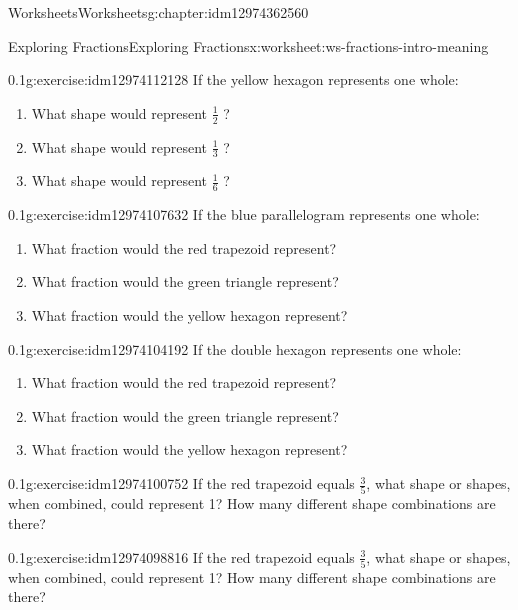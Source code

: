 \documentclass[twoside,11pt,]{book}
\begin{document}
\begin{chapterptx}{Worksheets}{}{Worksheets}{}{}{g:chapter:idm12974362560}
\begin{worksheet-section-numberless}{Exploring Fractions}{}{Exploring Fractions}{}{}{x:worksheet:ws-fractions-intro-meaning}
\begin{divisionexercise}{4}{}{0.1}{g:exercise:idm12974112128}%
If the yellow hexagon represents one whole:%
%
\begin{enumerate}[label=(\alph*)]
\item{}What shape would represent \(\frac{1}{2} \) ?%
\item{}What shape would represent \(\frac{1}{3} \) ?%
\item{}What shape would represent \(\frac{1}{6} \) ?%
\end{enumerate}
\end{divisionexercise}%
\begin{divisionexercise}{5}{}{0.1}{g:exercise:idm12974107632}%
If the blue parallelogram represents one whole:%
%
\begin{enumerate}[label=(\alph*)]
\item{}What fraction would the red trapezoid represent?%
\item{}What fraction would the green triangle represent?%
\item{}What fraction would the yellow hexagon represent?%
\end{enumerate}
\end{divisionexercise}%
\begin{divisionexercise}{6}{}{0.1}{g:exercise:idm12974104192}%
If the double hexagon represents one whole:%
%
\begin{enumerate}[label=(\alph*)]
\item{}What fraction would the red trapezoid represent?%
\item{}What fraction would the green triangle represent?%
\item{}What fraction would the yellow hexagon represent?%
\end{enumerate}
\end{divisionexercise}%
\begin{divisionexercise}{7}{}{0.1}{g:exercise:idm12974100752}%
If the red trapezoid equals \(\frac{3}{5} \), what shape or shapes, when combined, could represent 1?  How many different shape combinations are there?%
\end{divisionexercise}%
\begin{divisionexercise}{8}{}{0.1}{g:exercise:idm12974098816}%
If the red trapezoid equals \(\frac{3}{5} \), what shape or shapes, when combined, could represent 1?  How many different shape combinations are there?%
\end{divisionexercise}%
\begin{introduction}{}%

\end{introduction}
\end{worksheet-section-numberless}
\end{chapterptx}
\end{document}
